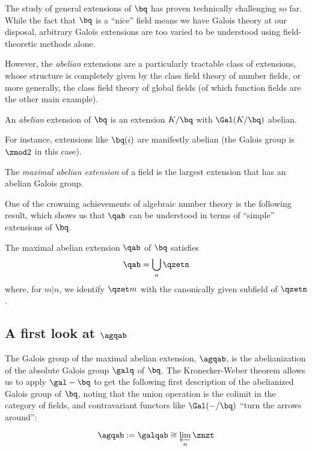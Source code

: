 The study of general extensions of $\bq$ has proven technically challenging so
far. While the fact that $\bq$ is a ``nice'' field means we have Galois theory
at our disposal, arbitrary Galois extensions are too varied to be understood
using field-theoretic methods alone.

However, the \textit{abelian} extensions are a particularly tractable class
of extensions, whose structure is completely given by the class field theory of
number fields, or more generally, the class field theory of global fields (of
which function fields are the other main example).

\begin{defn}
  An \textit{abelian} extension of $\bq$ is an extension $K/\bq$ with
  $\Gal(K/\bq)$ abelian.
\end{defn}

For instance, extensions like $\bq(i)$ are manifestly abelian (the Galois group
is $\zmod 2$ in this case).

\begin{defn}
  The \textit{maximal abelian extension} of a field is the largest extension
  that has an abelian Galois group.
\end{defn}

One of the crowning achievements of algebraic number theory is the following
result, which shows us that $\qab$ can be understood in terms of ``simple''
extensions of $\bq$.

\begin{thm}
  The maximal abelian extension $\qab$ of $\bq$ satisfies
  \[ \qab = \bigcup_n \qzetn \]
  where, for $m|n$, we identify $\qzet m$ with the canonically given subfield of
  $\qzetn$.
\end{thm}

\subsection{A first look at $\agqab$}

The Galois group of the maximal abelian extension, $\agqab$, is the
abelianization of the absolute Galois group $\galq$ of $\bq$.
The Kronecker-Weber theorem allows us to apply $\gal - \bq$ to get the following
first description of the abelianized Galois group of $\bq$, noting that the
union operation is the colimit in the category of fields, and contravariant
functors like $\Gal(-/\bq)$ ``turn the arrows around'':

\[ \agqab := \galqab \cong \varprojlim_n \znzt \]

